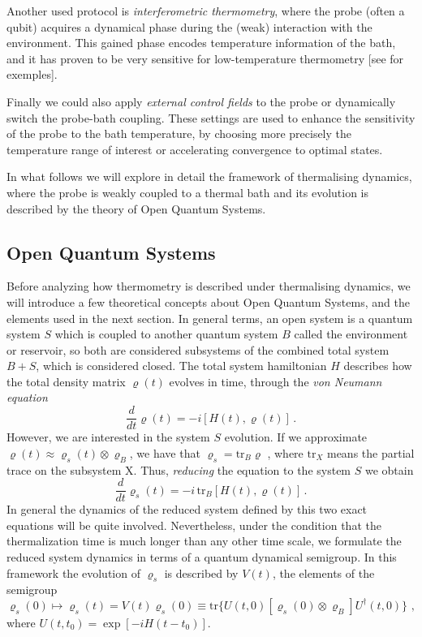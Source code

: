 Another used protocol is \textit{interferometric thermometry}, where the probe (often a qubit) acquires a dynamical phase during the (weak) interaction with the environment. This gained phase encodes temperature information of the bath, and it has proven to be very sensitive for low-temperature thermometry [see \cite{Stace2010}\cite{Jarzyna2015}\cite{MartinMartinez2013}\cite{Sabin2014} for exemples].

Finally we could also apply \textit{external control fields} to the probe or dynamically switch the probe-bath coupling. These settings are used to enhance the sensitivity of the probe to the bath temperature, by choosing more precisely the temperature range of interest or accelerating convergence to optimal states. 

In what follows we will explore in detail the framework of thermalising dynamics, where the probe is weakly coupled to a thermal bath and its evolution is described by the theory of Open Quantum Systems.

\subsection{Open Quantum Systems}\label{Open Quantum Systems}
Before analyzing how thermometry is described under thermalising dynamics, we will introduce a few theoretical concepts about Open Quantum Systems, and the elements used in the next section.
In general terms, an open system is a quantum system $S$ which is coupled to another quantum system $B$ called the environment or reservoir, so both are considered subsystems of the combined total system $B+S$, which is considered closed. The total system hamiltonian $H$ describes how the total density matrix $\varrho(t)$ evolves in time, through the \textit{von Neumann equation}
\begin{equation}\label{von Neumann - T}
    \frac{d}{dt}\varrho(t)=-i\left[ H(t), \varrho(t)\right]\,.
\end{equation}
However, we are interested in the system $S$ evolution. If we approximate $\varrho(t)\approx \varrho_s(t)\otimes\varrho_B$, we have that $\varrho_s=\text{tr}_B\varrho$ , where $\text{tr}_X$ means the partial trace on the subsystem X. Thus, \textit{reducing} the equation to the system $S$ we obtain
\begin{equation}\label{von Neumann - S}
    \frac{d}{dt}\varrho_s(t)=-i\,\text{tr}_B\left[ H(t), \varrho(t)\right]\, .
\end{equation}
In general the dynamics of the reduced system defined by this two exact equations will be quite involved. Nevertheless, under the condition that the thermalization time is much longer than any other time scale, we formulate the reduced system dynamics in terms of a quantum dynamical semigroup. In this framework the evolution of $\varrho_s$ is described by $V(t)$, the elements of the semigroup 
\begin{equation}
    \varrho_s(0) \longmapsto \varrho_s(t)=V(t)\varrho_s(0) \equiv \text{tr}\{U(t,0)[\varrho_s(0)\otimes\varrho_B]U^\dagger(t,0)\}\,\,,
\end{equation}
where $U(t,t_0)=\exp[-iH(t-t_0)]$. 

